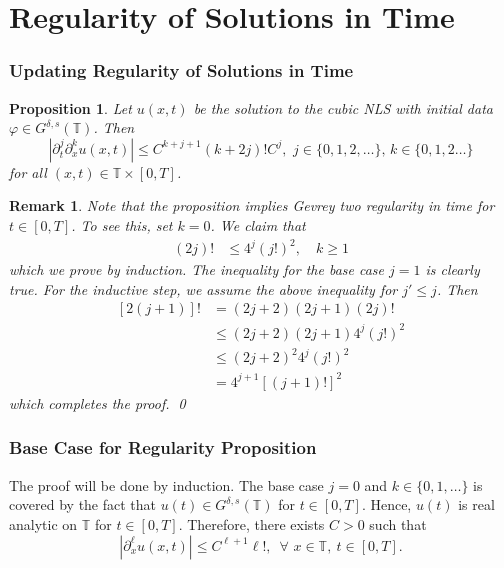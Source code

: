 \documentclass{beamer}
\numberwithin{equation}{section}
\newcommand{\ci}{\mathbb{T}}
\newtheorem{proposition}{Proposition}
\newtheorem{remark}{Remark}
\begin{document}
\section{Regularity of Solutions in Time}
\begin{frame}
  \frametitle{Updating Regularity of Solutions in Time}
%
%
%
\begin{proposition}
\label{fderivative}
Let  $u(x,t)$ be the solution to the cubic NLS 
with initial data  $\varphi\in G^{\delta, s}(\mathbb{T})$. 
Then
\begin{equation*}
 \left |
\partial_t^j\partial_x^k u(x,t)\right | \leq
C^{k+j+1}(k+2j)! C^j,\,\,j\in \{0,1,2,\dots\},\,k
\in \{0,1,2\dots\}
\end{equation*}
for all $(x,t)\in \mathbb{T}\times [0,T]$.
\end{proposition}
\end{frame}
%
%
\begin{frame}
%
%
\begin{remark}
Note that the proposition implies Gevrey two regularity in time for $t \in
[0, T]$. To see this, set $k = 0$. We claim that
%
%
\begin{equation*}
\begin{split}
(2j)!
& \le 4^{j} (j!)^{2}, \quad k \ge 1
\end{split}
\end{equation*}
%
%
\pause
which we prove by induction. The inequality for the base case $j=1$ is clearly
true. For the inductive step, we assume the above inequality for $j' \le j$. Then
%
%
\begin{equation*}
\begin{split}
[2(j+1)]!
& = (2j+2)(2j+1)(2j)! 
\\
& \le (2j+2)(2j+1)4^{j}(j!)^{2}
\\
& \le (2j+2)^{2}4^{j}(j!)^{2}
\\
& = 4^{j+1} [(j+1)!]^{2}
\end{split}
\end{equation*}
%
%
which completes the proof. \qed
\label{rem:implication-gev}
\end{remark}
%
%
\end{frame}
\begin{frame}
  \frametitle{Base Case for Regularity Proposition}
The proof will be
done by induction. The base case $j=0$ and $k\in \{0,1,\dots \}$ 
is covered by the fact that $u(t) \in G^{\delta, s}(\mathbb{T})$ for $t \in
[0, T]$. Hence, $u(t)$ is real analytic on $\ci$ for $t \in [0, T]$. Therefore, there
exists $C>0$ such that 
%
\begin{equation*}
|\partial_x^\ell u(x,t)|\leq
C^{\ell+1}\ell!,\,\,\,\forall\,\,x\in \mathbb{T}, \ t \in [0, T].
\end{equation*}
\end{frame}
\end{document}
